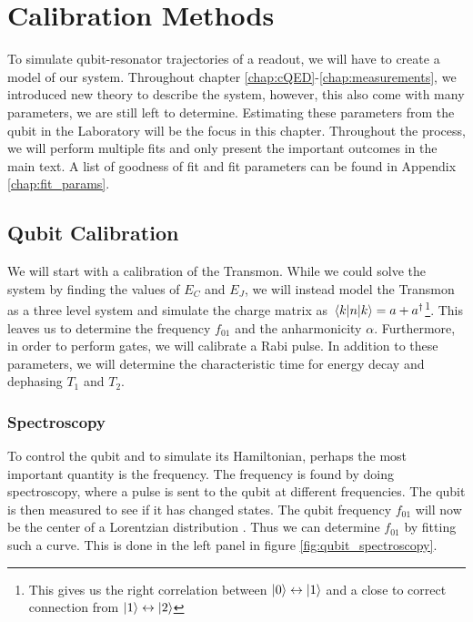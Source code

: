 \chapter{Calibration Methods}\label{chap:calibration}
To simulate qubit-resonator trajectories of a readout, we will have to create a model of our system. Throughout chapter \ref{chap:cQED}-\ref{chap:measurements}, we introduced new theory to describe the system, however, this also come with many parameters, we are still left to determine. Estimating these parameters from the qubit in the Laboratory will be  the focus in this chapter. Throughout the process, we will perform multiple fits and only present the important outcomes in the main text. A list of goodness of fit and fit parameters can be found in Appendix \ref{chap:fit_params}.




\section{Qubit Calibration}
We will start with a calibration of the Transmon. While we could solve the system by finding the values of $E_C$ and $E_J$, we will instead model the Transmon as a three level system and simulate the charge matrix as $\mel{k}{n}{k} = a + a^\dagger$\footnote{This gives us the right correlation between $\ket{0}\leftrightarrow \ket{1}$ and a close to correct connection from $\ket{1}\leftrightarrow\ket{2}$}. This leaves us to determine the frequency $f_{01}$ and the anharmonicity $\alpha$. Furthermore, in order to perform gates, we will calibrate a Rabi pulse. In addition to these parameters, we will determine the characteristic time for energy decay and dephasing  $T_1$ and $T_2$.

\subsection{Spectroscopy}\label{sec:qubit_spectroscopy}
To control the qubit and to simulate its Hamiltonian, perhaps the most important quantity is the frequency. The frequency is found by doing spectroscopy, where a pulse is sent to the qubit at different frequencies. The qubit is then measured to see if it has changed states. The qubit frequency $f_{01}$ will now be the center of a Lorentzian distribution \cite{hucul_trapped_ion}. Thus we can determine $f_{01}$ by fitting such a curve. This is done in the left panel in figure \ref{fig:qubit_spectroscopy}.

